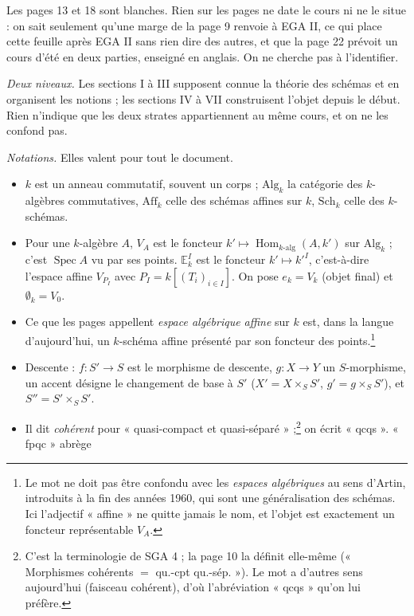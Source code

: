 \documentclass[11pt,a4paper]{article}
\begin{document}
Les pages 13 et 18 sont blanches. Rien sur les pages ne date le cours ni ne le
situe : on sait seulement qu'une marge de la page 9 renvoie à EGA II, ce qui
place cette feuille après EGA II sans rien dire des autres, et que la page 22
prévoit un cours d'été en deux parties, enseigné en anglais. On ne
cherche pas à l'identifier.

\emph{Deux niveaux.} Les sections I à III supposent connue la théorie des
schémas et en organisent les notions ; les sections IV à VII construisent
l'objet depuis le début. Rien n'indique que les deux strates appartiennent au
même cours, et on ne les confond pas.

\emph{Notations.} Elles valent pour tout le document.

\begin{itemize}
  \item $k$ est un anneau commutatif, souvent un corps ; $\mathrm{Alg}_k$ la
  catégorie des $k$-algèbres commutatives, $\mathrm{Aff}_k$ celle des schémas
  affines sur $k$, $\mathrm{Sch}_k$ celle des $k$-schémas.
  \item Pour une $k$-algèbre $A$, $V_A$ est le foncteur
  $k' \mapsto \operatorname{Hom}_{k\text{-alg}}(A, k')$ sur $\mathrm{Alg}_k$ ;
  c'est $\operatorname{Spec} A$ vu par ses points. $\mathbb{E}^I_k$ est le
  foncteur $k' \mapsto k'^I$, c'est-à-dire l'espace affine $V_{P_I}$ avec
  $P_I = k[(T_i)_{i \in I}]$. On pose $e_k = V_k$ (objet final) et
  $\emptyset_k = V_0$.
  \item Ce que les pages appellent \emph{espace algébrique affine} sur $k$ est,
  dans la langue d'aujourd'hui, un $k$-schéma affine présenté par son foncteur
  des points.\footnote{Le mot ne doit pas être confondu avec les \emph{espaces
  algébriques} au sens d'Artin, introduits à la fin des années 1960, qui sont
  une généralisation des schémas. Ici l'adjectif « affine » ne quitte jamais le
  nom, et l'objet est exactement un foncteur représentable $V_A$.}
  \item Descente : $f : S' \to S$ est le morphisme de descente,
  $g : X \to Y$ un $S$-morphisme, un accent désigne le changement de base à
  $S'$ ($X' = X \times_S S'$, $g' = g \times_S S'$), et
  $S'' = S' \times_S S'$.
  \item Il dit \emph{cohérent} pour « quasi-compact et
  quasi-séparé » ;\footnote{C'est la terminologie de SGA 4 ; la page 10 la
  définit elle-même (« Morphismes cohérents $=$ qu.-cpt qu.-sép. »). Le mot a
  d'autres sens aujourd'hui (faisceau cohérent), d'où l'abréviation
  « qcqs » qu'on lui préfère.} on écrit « qcqs ». « fpqc » abrège

\end{itemize}
\end{document}
